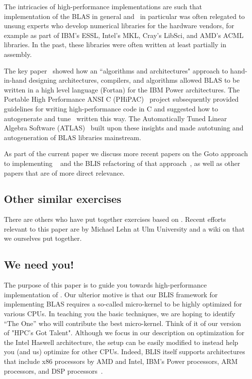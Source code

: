 The intricacies of high-performance implementations are such that implementation of the BLAS in general and \Gemm\ in particular was 
often relegated to 
unsung experts who develop numerical libraries for the hardware vendors, for example as part of IBM's ESSL, Intel's MKL, Cray's LibSci, and AMD's ACML libraries.  In the past,
these libraries were often written at least partially in assembly.

The key paper~\cite{IBM:P2} showed how an ``algorithms and architectures" approach to hand-in-hand designing architectures, compilers, and algorithms allowed 
BLAS to be written in a high level language (Fortan) for the IBM Power architectures.
The Portable High Performance ANSI C (PHiPAC)~\cite{PHiPAC97} project subsequently provided guidelines for writing high-performance code in C and suggested how to autogenerate and tune \Gemm\ written this way.  The Automatically Tuned Linear Algebra Software (ATLAS)~\cite{ATLAS,ATLAS_journal} built upon these insights and made autotuning and autogeneration of BLAS libraries mainstream.

As part of the current paper we discuss more recent papers on the Goto approach to implementing \Gemm~\cite{Goto:2008:AHP} and the BLIS refactoring of that approach~\cite{BLIS1}, as well as other papers that are of more direct relevance.  

\subsection{Other similar exercises}

There are others who have put together exercises based on {\Gemm}.
Recent efforts relevant to this paper are
by Michael Lehn at Ulm University and  a wiki on 
 that we ourselves put together.
 

\subsection{We need you!}

The purpose of this paper is to guide you towards high-performance
implementation of \Gemm.  Our ulterior motive is that our BLIS framework for implementing BLAS requires a so-called micro-kernel to be highly optimized for various CPUs.  In teaching you the basic techniques, we are hoping to identify  ``The One'' who will contribute the best micro-kernel.
Think of it of our version of "HPC's Got Talent".
Although  we focus in our description on optimization for the Intel Haswell architecture, the setup can be easily modified to instead help you (and us) optimize for other CPUs.  Indeed, BLIS itself supports architectures that include x86 processors by AMD and Intel, IBM's Power processors, ARM processors, and DSP processors~\cite{BLIS2,BLIS3,BLIS-TI}.
